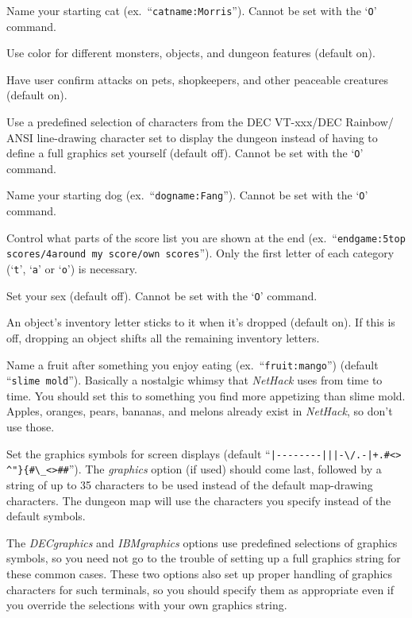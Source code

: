 \blist{}
\item[\ib{catname}]
Name your starting cat (ex.\ ``{\tt catname:Morris}'').
Cannot be set with the `{\tt O}' command.
\item[\ib{color}]
Use color for different monsters, objects, and dungeon features (default on).
\item[\ib{confirm}]
Have user confirm attacks on pets, shopkeepers, and other
peaceable creatures (default on).
\item[\ib{DECgraphics}]
Use a predefined selection of characters from the DEC VT-xxx/DEC Rainbow/
ANSI line-drawing character set to display the dungeon instead of having
to define a full graphics set yourself (default off).
Cannot be set with the `{\tt O}' command.
\item[\ib{dogname}]
Name your starting dog (ex.\ ``{\tt dogname:Fang}'').
Cannot be set with the `{\tt O}' command.
\item[\ib{endgame}]
Control what parts of the score list you are shown at the end (ex.\
``{\tt endgame:5top scores/4around my score/own scores}'').  Only the first
letter of each category (`{\tt t}', `{\tt a}' or `{\tt o}') is necessary.
\item[\ib{female}]
Set your sex (default off). Cannot be set with the `{\tt O}' command.
\item[\ib{fixinvlet}]
An object's inventory letter sticks to it when it's dropped (default on).
If this is off, dropping an object shifts all the remaining inventory letters.
\item[\ib{fruit}]
Name a fruit after something you enjoy eating (ex.\ ``{\tt fruit:mango}'')
(default ``{\tt slime mold}''). Basically a nostalgic whimsy that
{\it NetHack\/} uses from time to time.  You should set this to something you
find more appetizing than slime mold.  Apples, oranges, pears, bananas, and
melons already exist in {\it NetHack}, so don't use those.
\item[\ib{graphics}]
Set the graphics symbols for screen displays (default
``\verb&|--------|||-\/.-|+.#<>& \verb&^"}{#\_<>##&''). The
{\it graphics\/}
option (if used) should come last, followed by a string of up to 35
characters to be used instead of the default map-drawing characters.
The dungeon map will use the characters you specify instead of the
default symbols.

The
{\it DECgraphics}
and
{\it IBMgraphics}
options use predefined selections of graphics symbols, so you need not
go to the trouble of setting up a full graphics string for these common
cases.  These two options also set up proper handling of graphics
characters for such terminals, so you should specify them as appropriate
even if you override the selections with your own graphics string.

